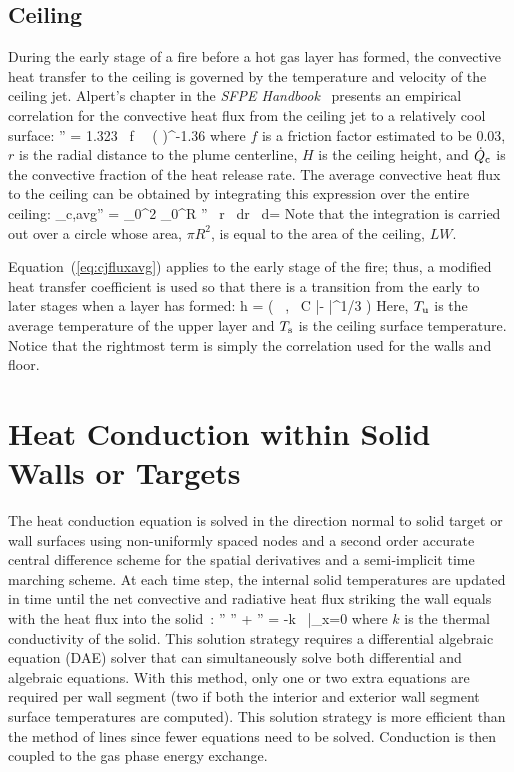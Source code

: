 \subsection{Ceiling}

During the early stage of a fire before a hot gas layer has formed, the convective heat transfer to the ceiling is governed by the temperature and velocity of the ceiling jet. Alpert's chapter in the {\em SFPE Handbook}~\cite{Alpert:SFPE} presents an empirical correlation for the convective heat flux from the ceiling jet to a relatively cool surface:
\be
   \dqc'' = 1.323 \, f \,  \, \left(  \right)^{-1.36}  \label{eq:cjflux}
\ee
where $f$ is a friction factor estimated to be 0.03, $r$ is the radial distance to the plume centerline, $H$ is the ceiling height, and $\dot{Q}_{\rm c}$ is the convective fraction of the heat release rate. The average convective heat flux to the ceiling can be obtained by integrating this expression over the entire ceiling:
\be
   \dq_{\rm c,avg}'' =  \int_0^{2\pi} \int_0^R \dqc'' \, r \, dr \, d\theta =  \label{eq:cjfluxavg}
\ee
Note that the integration is carried out over a circle whose area, $\pi R^2$, is equal to the area of the ceiling, $LW$.

Equation~(\ref{eq:cjfluxavg}) applies to the early stage of the fire; thus, a modified heat transfer coefficient is used so that there is a transition from the early to later stages when a layer has formed:
\be
   h = \max \left(  \, , \, C {|\Tu - \Ts|}^{1/3} \right)
\ee
Here, $T_{\rm u}$ is the average temperature of the upper layer and $T_{\rm s}$ is the ceiling surface temperature. Notice that the rightmost term is simply the correlation used for the walls and floor.

\section{Heat Conduction within Solid Walls or Targets}

The heat conduction equation is solved in the direction normal to solid target or wall surfaces using non-uniformly spaced nodes and a second order accurate central difference scheme for the spatial derivatives and a semi-implicit time marching scheme. At each time step, the internal solid temperatures are updated in time until the net convective and radiative heat flux striking the wall equals with the heat flux into the solid~\cite{Moss:1992}:
\be
   \dq'' \equiv \dqr'' + \dqc'' = -k \,  \Big|_{x=0}
\ee
where $k$ is the thermal conductivity of the solid.  This solution strategy requires a differential algebraic equation (DAE) solver that can simultaneously solve both differential and algebraic equations.  With this method, only one or two extra equations are required per wall segment (two if both the interior and exterior wall segment surface temperatures are computed).  This solution strategy is more efficient than the method of lines since fewer equations need to be solved. Conduction is then coupled to the gas phase energy exchange.

